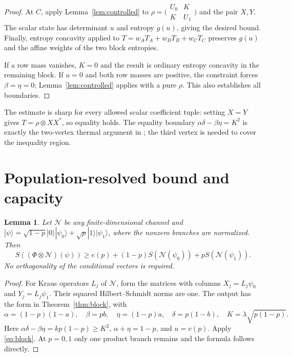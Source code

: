 \documentclass[11pt]{article}
\newtheorem{lemma}[theorem]{Lemma}
\begin{document}
\begin{proof}
At $C$, apply Lemma~\ref{lem:controlled} to
$\rho=\bigl(\begin{smallmatrix}U_0&K\\K&U_1\end{smallmatrix}\bigr)$ and the pair $X,Y$. The scalar state has determinant $u$ and entropy $g(u)$, giving the desired bound. Finally, entropy concavity applied to
$T=w_AT_A+w_BT_B+w_CT_C$ preserves $g(u)$ and the affine weights of the two block entropies.

If a row mass vanishes, $K=0$ and the result is ordinary entropy concavity in the remaining block. If $u=0$ and both row masses are positive, the constraint forces $\beta=\eta=0$; Lemma~\ref{lem:controlled} applies with a pure $\rho$. This also establishes all boundaries.
\end{proof}
The estimate is sharp for every allowed scalar coefficient tuple: setting $X=Y$ gives $T=\rho\otimes XX^*$, so equality holds. The equality boundary $\alpha\delta-\beta\eta=K^2$ is exactly the two-vertex thermal argument in \cite[Theorem 3.1]{openai}; the third vertex is needed to cover the inequality region.

\section{Population-resolved bound and capacity}
\begin{lemma}\label{lem:step}
Let $\mathcal N$ be any finite-dimensional channel and
$|\psi\rangle=\sqrt{1-p}|0\rangle|\psi_0\rangle+
\sqrt p|1\rangle|\psi_1\rangle$, where the nonzero branches are normalized. Then
\begin{equation}\label{eq:step}
 S((\Phi\otimes\mathcal N)(\psi))
 \ge e(p)+(1-p)S(\mathcal N(\psi_0))+pS(\mathcal N(\psi_1)).
\end{equation}
No orthogonality of the conditional vectors is required.
\end{lemma}
\begin{proof}
For Kraus operators $L_j$ of $\mathcal N$, form the matrices with columns
$X_j=L_j\psi_0$ and $Y_j=L_j\psi_1$. Their squared Hilbert--Schmidt norms are one. The output has the form in Theorem~\ref{thm:block}, with
\[
 \alpha=(1-p)(1-a),\quad\beta=pb,\quad
 \eta=(1-p)a,\quad\delta=p(1-b),\quad
 K=\lambda\sqrt{p(1-p)}.
\]
Here $\alpha\delta-\beta\eta=kp(1-p)\ge K^2$,
$\alpha+\eta=1-p$, and $u=v(p)$. Apply \eqref{eq:block}. At $p=0,1$ only one product branch remains and the formula follows directly.
\end{proof}
\end{document}
